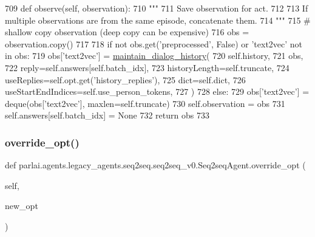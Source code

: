\begin{DoxyCode}
709     \textcolor{keyword}{def }observe(self, observation):
710         \textcolor{stringliteral}{"""}
711 \textcolor{stringliteral}{        Save observation for act.}
712 \textcolor{stringliteral}{}
713 \textcolor{stringliteral}{        If multiple observations are from the same episode, concatenate them.}
714 \textcolor{stringliteral}{        """}
715         \textcolor{comment}{# shallow copy observation (deep copy can be expensive)}
716         obs = observation.copy()
717 
718         \textcolor{keywordflow}{if} \textcolor{keywordflow}{not} obs.get(\textcolor{stringliteral}{'preprocessed'}, \textcolor{keyword}{False}) \textcolor{keywordflow}{or} \textcolor{stringliteral}{'text2vec'} \textcolor{keywordflow}{not} \textcolor{keywordflow}{in} obs:
719             obs[\textcolor{stringliteral}{'text2vec'}] = \hyperlink{namespaceparlai_1_1agents_1_1legacy__agents_1_1seq2seq_1_1utils__v0_ac7cb3ffae208474d6e67f37ecfe07f64}{maintain\_dialog\_history}(
720                 self.history,
721                 obs,
722                 reply=self.answers[self.batch\_idx],
723                 historyLength=self.truncate,
724                 useReplies=self.opt.get(\textcolor{stringliteral}{'history\_replies'}),
725                 dict=self.dict,
726                 useStartEndIndices=self.use\_person\_tokens,
727             )
728         \textcolor{keywordflow}{else}:
729             obs[\textcolor{stringliteral}{'text2vec'}] = deque(obs[\textcolor{stringliteral}{'text2vec'}], maxlen=self.truncate)
730         self.observation = obs
731         self.answers[self.batch\_idx] = \textcolor{keywordtype}{None}
732         \textcolor{keywordflow}{return} obs
733 
\end{DoxyCode}
\mbox{\label{classparlai_1_1agents_1_1legacy__agents_1_1seq2seq_1_1seq2seq__v0_1_1Seq2seqAgent_ad40d38a1cc2cafe32c43477740b4a164}} 
\subsubsection{\texorpdfstring{override\+\_\+opt()}{override\_opt()}}
{\footnotesize\ttfamily def parlai.\+agents.\+legacy\+\_\+agents.\+seq2seq.\+seq2seq\+\_\+v0.\+Seq2seq\+Agent.\+override\+\_\+opt (\begin{DoxyParamCaption}\item[{}]{self,  }\item[{}]{new\+\_\+opt }\end{DoxyParamCaption})}

